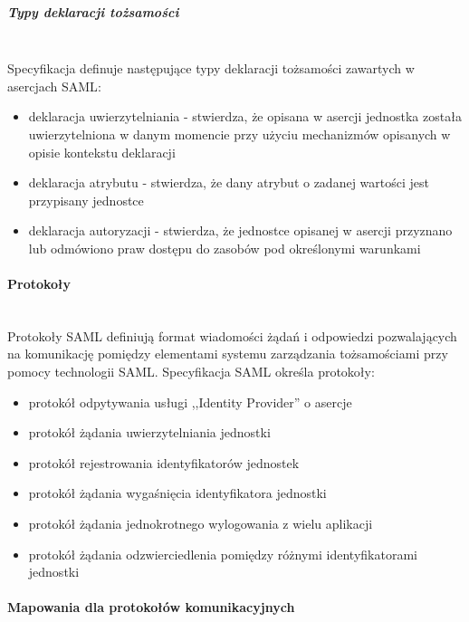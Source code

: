 			\subparagraph{Typy deklaracji tożsamości}\mbox{}\\

				Specyfikacja definuje następujące typy deklaracji tożsamości zawartych w asercjach SAML\cite{Wisniewski05}:

				\begin{itemize}
				  \item deklaracja uwierzytelniania - stwierdza, że opisana w asercji jednostka została uwierzytelniona w danym momencie przy użyciu mechanizmów opisanych w opisie kontekstu deklaracji
				  \item deklaracja atrybutu - stwierdza, że dany atrybut o zadanej wartości jest przypisany jednostce
				  \item deklaracja autoryzacji - stwierdza, że jednostce opisanej w asercji przyznano lub odmówiono praw dostępu do zasobów pod określonymi warunkami
				 \end{itemize}

		\paragraph{Protokoły}\mbox{}\\ 

			Protokoły SAML definiują format wiadomości żądań i odpowiedzi pozwalających na komunikację pomiędzy elementami systemu zarządzania tożsamościami przy pomocy technologii SAML. Specyfikacja SAML określa protokoły:

			\begin{itemize}
			  \item protokół odpytywania usługi ,,Identity Provider'' o asercje
			  \item protokół żądania uwierzytelniania jednostki
			  \item protokół rejestrowania identyfikatorów jednostek
			  \item protokół żądania wygaśnięcia identyfikatora jednostki
			  \item protokół żądania jednokrotnego wylogowania z wielu aplikacji
			  \item protokół żądania odzwierciedlenia pomiędzy różnymi identyfikatorami jednostki
			\end{itemize}

		\paragraph{Mapowania dla protokołów komunikacyjnych}\mbox{}\\

